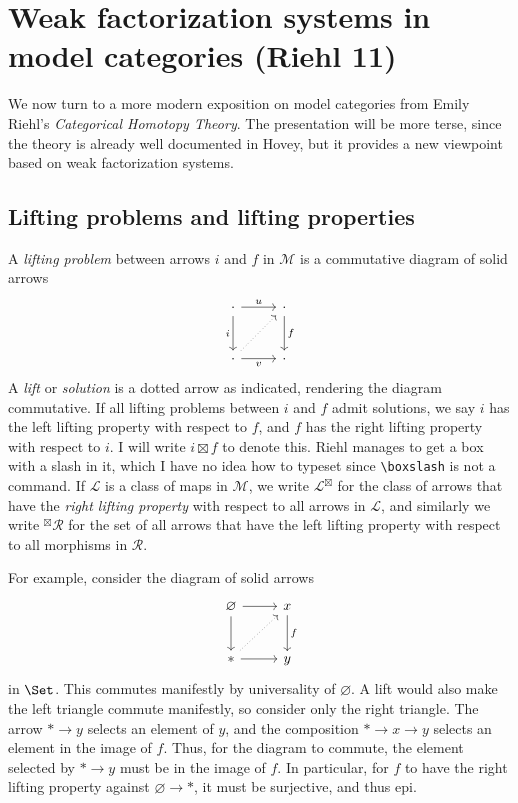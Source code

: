 \chapter{Weak factorization systems in model categories (Riehl 11)}

We now turn to a more modern exposition on model categories from Emily Riehl's \emph{Categorical Homotopy Theory}. The presentation will be more terse, since the theory is already well documented in Hovey, but it provides a new viewpoint based on weak factorization systems.

\section{Lifting problems and lifting properties}

A \emph{lifting problem} between arrows $i$ and $f$ in $\mathcal{M} $ is a commutative diagram of solid arrows
\[\begin{tikzcd}[row sep = 2.5em, column sep = 2.5em]
\cdot \ar[" u ", r] \ar[" i "', d]  & \cdot \ar[" f ", d]  \\
\cdot  \ar[" v "', r] \ar[dotted, ur]  & \cdot 
\end{tikzcd}\]
A \emph{lift} or \emph{solution} is a dotted arrow as indicated, rendering the diagram commutative. If all lifting problems between $i$ and $f$ admit solutions, we say $i$ has the left lifting property with respect to $f$, and $f$ has the right lifting property with respect to $i$. I will write $i\boxtimes f$ to denote this. Riehl manages to get a box with a slash in it, which I have no idea how to typeset since \verb|\boxslash| is not a command. If $\mathcal{L} $ is a class of maps in $\mathcal{M} $, we write $\mathcal{L} ^{\boxtimes} $ for the class of arrows that have the \emph{right lifting property} with respect to all arrows in $\mathcal{L} $, and similarly we write ${}^{\boxtimes} \mathcal{R} $ for the set of all arrows that have the left lifting property with respect to all morphisms in $\mathcal{R} $.

For example, consider the diagram of solid arrows
\[\begin{tikzcd}[row sep = 2.5em, column sep = 2.5em]
\varnothing \ar[r] \ar[d]  & x \ar[" f ", d]  \\
* \ar[r] \ar[dotted, ur] & y
\end{tikzcd}\]
in $\Set $. This commutes manifestly by universality of $\varnothing $. A lift would also make the left triangle commute manifestly, so consider only the right triangle. The arrow $*\to y$ selects an element of $y$, and the composition $*\to x\to y$ selects an element in the image of $f$. Thus, for the diagram to commute, the element selected by $*\to y$ must be in the image of $f$. In particular, for $f$ to have the right lifting property against $\varnothing \to *$, it must be surjective, and thus epi.

